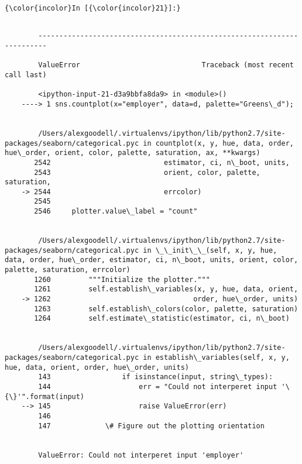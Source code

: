 \documentclass[11pt]{article}
\begin{document}
    \begin{Verbatim}[commandchars=\\\{\}]
{\color{incolor}In [{\color{incolor}21}]:} 
\end{Verbatim}


    \begin{Verbatim}[commandchars=\\\{\}]

        ------------------------------------------------------------------------

        ValueError                             Traceback (most recent call last)

        <ipython-input-21-d3a9bbfa8da9> in <module>()
    ----> 1 sns.countplot(x="employer", data=d, palette="Greens\_d");
    

        /Users/alexgoodell/.virtualenvs/ipython/lib/python2.7/site-packages/seaborn/categorical.pyc in countplot(x, y, hue, data, order, hue\_order, orient, color, palette, saturation, ax, **kwargs)
       2542                           estimator, ci, n\_boot, units,
       2543                           orient, color, palette, saturation,
    -> 2544                           errcolor)
       2545 
       2546     plotter.value\_label = "count"


        /Users/alexgoodell/.virtualenvs/ipython/lib/python2.7/site-packages/seaborn/categorical.pyc in \_\_init\_\_(self, x, y, hue, data, order, hue\_order, estimator, ci, n\_boot, units, orient, color, palette, saturation, errcolor)
       1260         """Initialize the plotter."""
       1261         self.establish\_variables(x, y, hue, data, orient,
    -> 1262                                  order, hue\_order, units)
       1263         self.establish\_colors(color, palette, saturation)
       1264         self.estimate\_statistic(estimator, ci, n\_boot)


        /Users/alexgoodell/.virtualenvs/ipython/lib/python2.7/site-packages/seaborn/categorical.pyc in establish\_variables(self, x, y, hue, data, orient, order, hue\_order, units)
        143                 if isinstance(input, string\_types):
        144                     err = "Could not interperet input '\{\}'".format(input)
    --> 145                     raise ValueError(err)
        146 
        147             \# Figure out the plotting orientation


        ValueError: Could not interperet input 'employer'

    \end{Verbatim}
\end{document}

